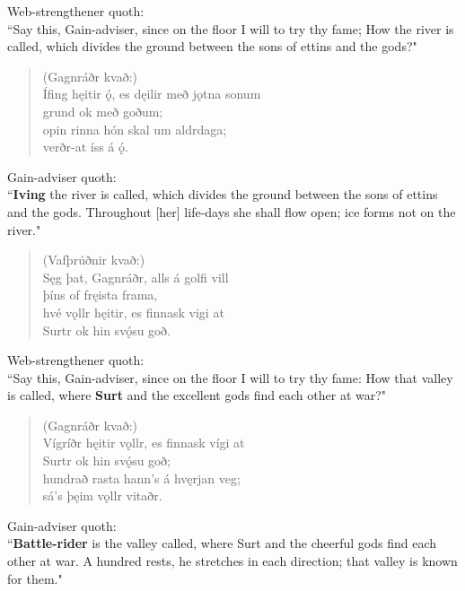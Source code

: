 \bvb Web-strengthener quoth: \\ “Say this, Gain-adviser, since on the floor I will to try thy fame; How the river is called, which divides the ground between the sons of ettins and the gods?" \\

\begin{verse}
(Gagnráðr kvað:) \\%
\bva Ífing hęitir ǫ́, \hld es dęilir með jǫtna sonum \\%
\ind grund ok með goðum; \\%
opin rinna \hld hón skal um aldrdaga; \\%
\ind verðr-at íss á ǫ́.\\%
\end{verse}

\bvb Gain-adviser quoth: \\ “\textbf{Iving} the river is called, which divides the ground between the sons of ettins and the gods. Throughout [her] life-days she shall flow open; ice forms not on the river." \\

\begin{verse}
(Vafþrúðnir kvað:) \\%
\bva Sęg þat, Gagnráðr, \hld alls á golfi vill \\%
\ind þíns of fręista frama, \\%
hvé vǫllr hęitir, \hld es finnask vigi at \\%
\ind Surtr ok hin svǫ́su goð.\\%
\end{verse}

\bvb Web-strengthener quoth: \\ “Say this, Gain-adviser, since on the floor I will to try thy fame: How that valley is called, where \textbf{Surt} and the excellent gods find each other at war?" \\

\begin{verse}
(Gagnráðr kvað:) \\%
\bva Vígríðr hęitir vǫllr, \hld es finnask vígi at \\%
\ind Surtr ok hin svǫ́su goð; \\%
hundrað rasta \hld hann's á hvęrjan veg; \\%
\ind sá's þęim vǫllr vitaðr.\\%
\end{verse}

\bvb Gain-adviser quoth: \\ “\textbf{Battle-rider} is the valley called, where Surt and the cheerful gods find each other at war. A hundred rests\footnotemark[30], he stretches in each direction; that valley is known for them.\footnotemark[31]" \\

